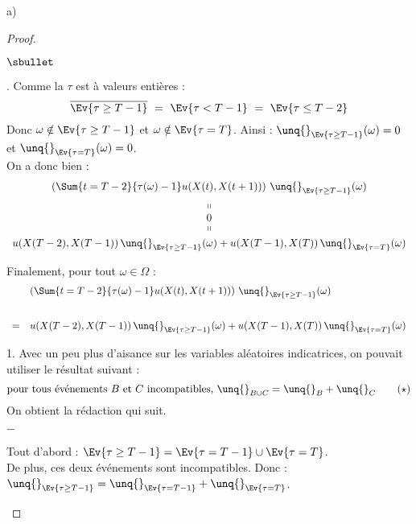 \documentclass[11pt]{article}%
\begin{document}
\begin{noliste}{a)}
\begin{proof}
\begin{noliste}{$\sbullet$}
        
        \item {}. Comme la \var $\tau$ est à valeurs entières :
	\[
	  \overline{\Ev{\tau \geq T-1}} \ = \ \Ev{\tau < T-1} \ = \
	  \Ev{\tau \leq T-2}
	\]
	Donc $\omega \notin \Ev{\tau \geq T-1}$ et $\omega \notin 
	\Ev{\tau =T}$.
	Ainsi : $\unq{}_{\Ev{\tau \geq T-1}}(\omega)=0$ et 
	$\unq{}_{\Ev{\tau=T}}(\omega)=0$.\\
	On a donc bien :
	\[
	  \begin{array}{c}
	    \left( \Sum{t=T-2}{\tau(\omega)-1} u(X(t),X(t+1))\right) 
	    \, \unq{}_{\Ev{\tau \geq T-1}}(\omega)
	    \\[.2cm]
	    \shortparallel
	    \\
	    0
	    \\[-.1cm]
	    \shortparallel
	    \\[.1cm]
	    u(X(T-2),X(T-1)) \, \unq{}_{\Ev{\tau \geq T-1}}(\omega)
	    + u(X(T-1),X(T)) \, \unq{}_{\Ev{\tau =T}}(\omega)
	  \end{array}
	\]
      \end{noliste}
      Finalement, pour tout $\omega \in \Omega$ :
      \[
        \begin{array}{cl}
          & \left( \Sum{t=T-2}{\tau(\omega)-1} u(X(t),X(t+1))\right) \,
          \unq{}_{\Ev{\tau \geq T-1}}(\omega)
          \\[.8cm]
          =& u(X(T-2),X(T-1)) \, \unq{}_{\Ev{\tau \geq T-1}}(\omega)
          + u(X(T-1),X(T)) \, \unq{}_{\Ev{\tau =T}}(\omega)
        \end{array}
      \]
      
      \begin{remarkL}{1.}
      Avec un peu plus d'aisance sur les variables aléatoires 
        indicatrices, on pouvait utiliser le résultat suivant :
        \[
          \text{pour tous événements $B$ et $C$ incompatibles, 
          $\unq{}_{B \cup C} = \unq{}_B + \unq{}_C$} \qquad (\star)
        \]
        On obtient la rédaction qui suit.
        \begin{noliste}{$-$}
	  \item Tout d'abord : $\Ev{\tau \geq T-1} = \Ev{\tau = T-1}
	  \cup \Ev{\tau =T}$.\\
	  De plus, ces deux événements sont incompatibles. Donc : 
	  $\unq{}_{\Ev{\tau \geq T-1}} = \unq{}_{\Ev{\tau =T-1}} + 
	  \unq{}_{\Ev{\tau =T}}$.
	  

\end{noliste}
\end{remarkL}
\end{proof}
\end{noliste}
\end{document}
